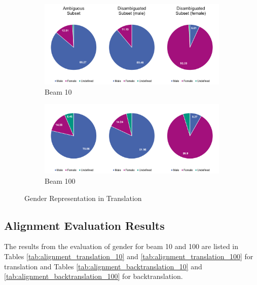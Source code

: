 \begin{figure}
     \centering
     
     \begin{subfigure}{\textwidth}
         \centering
         \includegraphics[width=\textwidth]{figures/gender/beam_10.png}
         \caption{Beam 10}
         \label{fig:three sin x}
     \end{subfigure}
     
     \begin{subfigure}{\textwidth}
         \centering
         \includegraphics[width=\textwidth]{figures/gender/beam_100.png}
         \caption{Beam 100}
         \label{fig:five over x}
     \end{subfigure}
     
     
    \caption{Gender Representation in Translation}
    \label{fig:gender_pie_10}
\end{figure}

\subsection{Alignment Evaluation Results}
\label{ch:Base_Experiment:Results:Alignment}

The results from the evaluation of gender for beam 10 and 100 are listed in Tables \ref{tab:alignment_translation_10} and \ref{tab:alignment_translation_100} for translation and Tables \ref{tab:alignment_backtranslation_10} and \ref{tab:alignment_backtranslation_100} for backtranslation.

